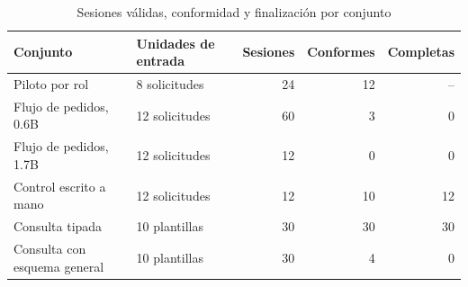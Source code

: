 \begin{table}[!t]
\caption{Sesiones válidas, conformidad y finalización por conjunto}
\label{tab:cohorts}
\centering\footnotesize
\setlength{\tabcolsep}{3pt}
\begin{tabular*}{\textwidth}{@{\extracolsep{\fill}}llrrr}
\hline
Conjunto & Unidades de entrada & Sesiones & Conformes & Completas\\
\hline
Piloto por rol & 8 solicitudes & 24 & 12 & --\\
Flujo de pedidos, 0.6B & 12 solicitudes & 60 & 3 & 0\\
Flujo de pedidos, 1.7B & 12 solicitudes & 12 & 0 & 0\\
Control escrito a mano & 12 solicitudes & 12 & 10 & 12\\
Consulta tipada & 10 plantillas & 30 & 30 & 30\\
Consulta con esquema general & 10 plantillas & 30 & 4 & 0\\
\hline\end{tabular*}\end{table}
